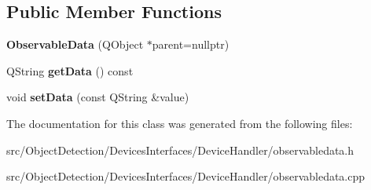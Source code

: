 \subsection*{Public Member Functions}
\begin{DoxyCompactItemize}
\item 
\mbox{\label{class_devices_1_1_observable_data_abb504c2ef0d30bcdf837d0d65ccb2051}} 
{\bfseries Observable\+Data} (Q\+Object $\ast$parent=nullptr)
\item 
\mbox{\label{class_devices_1_1_observable_data_a184c8f851ca0e0f527c7d4efea81b324}} 
Q\+String {\bfseries get\+Data} () const
\item 
\mbox{\label{class_devices_1_1_observable_data_a679da32e456f440f34131c807da3fbfd}} 
void {\bfseries set\+Data} (const Q\+String \&value)
\end{DoxyCompactItemize}


The documentation for this class was generated from the following files\+:\begin{DoxyCompactItemize}
\item 
src/\+Object\+Detection/\+Devices\+Interfaces/\+Device\+Handler/observabledata.\+h\item 
src/\+Object\+Detection/\+Devices\+Interfaces/\+Device\+Handler/observabledata.\+cpp\end{DoxyCompactItemize}
